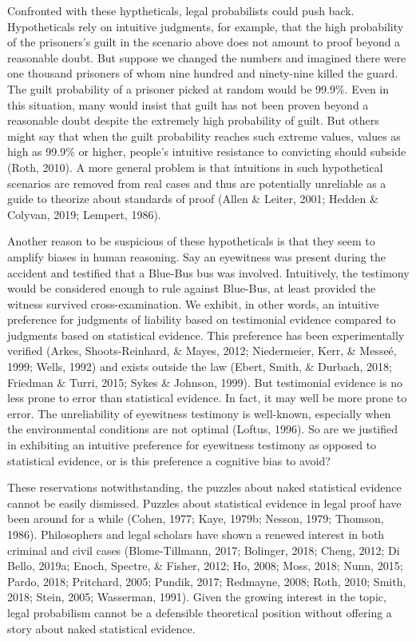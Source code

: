 \documentclass[10pt,dvipsnames,enabledeprecatedfontcommands]{scrartcl}
\begin{document}
Confronted with these hyptheticals, legal probabilists could push back.
Hypotheticals rely on intuitive judgments, for example, that the high
probability of the prisoners's guilt in the scenario above does not
amount to proof beyond a reasonable doubt. But suppose we changed the
numbers and imagined there were one thousand prisoners of whom nine
hundred and ninety-nine killed the guard. The guilt probability of a
prisoner picked at random would be 99.9\%. Even in this situation, many
would insist that guilt has not been proven beyond a reasonable doubt
despite the extremely high probability of guilt. But others might say
that when the guilt probability reaches such extreme values, values as
high as 99.9\% or higher, people's intuitive resistance to convicting
should subside (Roth, 2010). A more general problem is that intuitions
in such hypothetical scenarios are removed from real cases and thus are
potentially unreliable as a guide to theorize about standards of proof
(Allen \& Leiter, 2001; Hedden \& Colyvan, 2019; Lempert, 1986).

Another reason to be suspicious of these hypotheticals is that they seem
to amplify biases in human reasoning. Say an eyewitness was present
during the accident and testified that a Blue-Bus bus was involved.
Intuitively, the testimony would be considered enough to rule against
Blue-Bus, at least provided the witness survived cross-examination. We
exhibit, in other words, an intuitive preference for judgments of
liability based on testimonial evidence compared to judgments based on
statistical evidence. This preference has been experimentally verified
(Arkes, Shoots-Reinhard, \& Mayes, 2012; Niedermeier, Kerr, \& Messeé,
1999; Wells, 1992) and exists outside the law (Ebert, Smith, \& Durbach,
2018; Friedman \& Turri, 2015; Sykes \& Johnson, 1999). But testimonial
evidence is no less prone to error than statistical evidence. In fact,
it may well be more prone to error. The unreliability of eyewitness
testimony is well-known, especially when the environmental conditions
are not optimal (Loftus, 1996). So are we justified in exhibiting an
intuitive preference for eyewitness testimony as opposed to statistical
evidence, or is this preference a cognitive bias to avoid?

These reservations notwithstanding, the puzzles about naked statistical
evidence cannot be easily dismissed. Puzzles about statistical evidence
in legal proof have been around for a while (Cohen, 1977; Kaye, 1979b;
Nesson, 1979; Thomson, 1986). Philosophers and legal scholars have shown
a renewed interest in both criminal and civil cases (Blome-Tillmann,
2017; Bolinger, 2018; Cheng, 2012; Di Bello, 2019a; Enoch, Spectre, \&
Fisher, 2012; Ho, 2008; Moss, 2018; Nunn, 2015; Pardo, 2018; Pritchard,
2005; Pundik, 2017; Redmayne, 2008; Roth, 2010; Smith, 2018; Stein,
2005; Wasserman, 1991). Given the growing interest in the topic, legal
probabilism cannot be a defensible theoretical position without offering
a story about naked statistical evidence.
\end{document}
